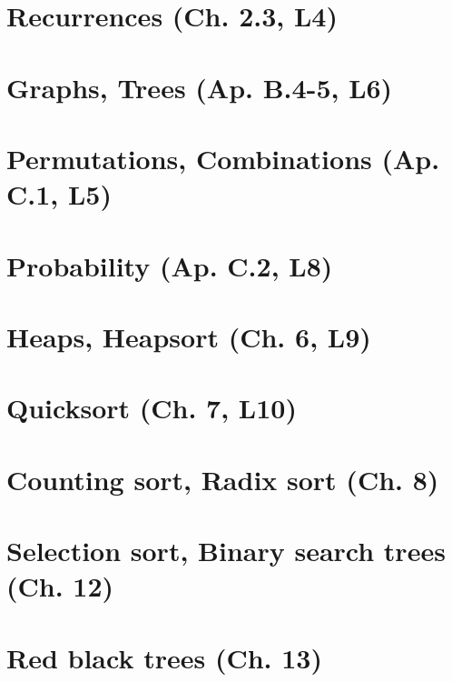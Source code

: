 \documentclass{article}
\begin{document}
\section{Recurrences (Ch. 2.3, L4)} %

\newpage

\section{Graphs, Trees (Ap. B.4-5, L6)} %

\newpage

\section{Permutations, Combinations (Ap. C.1, L5)} %

\newpage

\section{Probability (Ap. C.2, L8)} %

\newpage


\section{Heaps, Heapsort (Ch. 6, L9)} %

\newpage

\section{Quicksort (Ch. 7, L10)} %

\newpage

\section{Counting sort, Radix sort (Ch. 8)}

\newpage


\section{Selection sort, Binary search trees (Ch. 12)}

\newpage

\section{Red black trees (Ch. 13)}

\newpage
\end{document}
